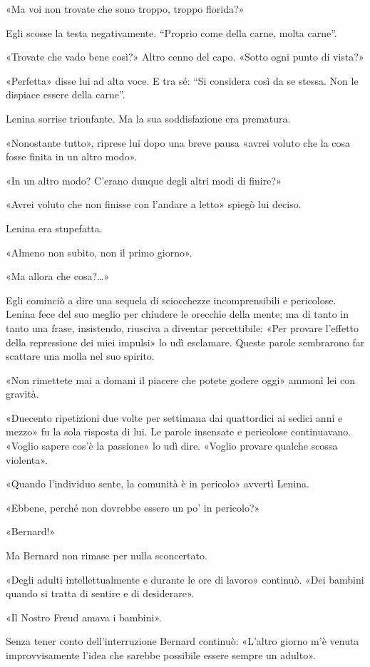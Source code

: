 \documentclass[
a5paper, %
10pt, %
twoside, 
onecolumn, %
openany, %
]{memoir}
\begin{document}
«Ma voi non trovate che sono troppo, troppo florida?»

Egli scosse la testa negativamente. “Proprio come della carne, molta carne”.

«Trovate che vado bene così?» Altro cenno del capo. «Sotto ogni punto di vista?»

«Perfetta» disse lui ad alta voce. E tra sé: “Si considera così da se stessa. Non le dispiace essere della carne”.

Lenina sorrise trionfante. Ma la sua soddisfazione era prematura.

«Nonostante tutto», riprese lui dopo una breve pausa «avrei voluto che la cosa fosse finita in un altro modo».

«In un altro modo? C’erano dunque degli altri modi di finire?»

«Avrei voluto che non finisse con l’andare a letto» spiegò lui deciso.

Lenina era stupefatta.

«Almeno non subito, non il primo giorno».

«Ma allora che cosa?…»

Egli cominciò a dire una sequela di sciocchezze incomprensibili e pericolose. Lenina fece del suo meglio per chiudere le orecchie della mente; ma di tanto in tanto una frase, insistendo, riusciva a diventar percettibile: «Per provare l’effetto della repressione dei miei impulsi» lo udì esclamare. Queste parole sembrarono far scattare una molla nel suo spirito.

«Non rimettete mai a domani il piacere che potete godere oggi» ammonì lei con gravità.

«Duecento ripetizioni due volte per settimana dai quattordici ai sedici anni e mezzo» fu la sola risposta di lui. Le parole insensate e pericolose continuavano. «Voglio sapere cos’è la passione» lo udì dire. «Voglio provare qualche scossa violenta».

«Quando l’individuo sente, la comunità è in pericolo» avvertì Lenina.

«Ebbene, perché non dovrebbe essere un po’ in pericolo?»

«Bernard!»

Ma Bernard non rimase per nulla sconcertato.

«Degli adulti intellettualmente e durante le ore di lavoro» continuò. «Dei bambini quando si tratta di sentire e di desiderare».

«Il Nostro Freud amava i bambini».

Senza tener conto dell’interruzione Bernard continuò: «L’altro giorno m’è venuta improvvisamente l’idea che sarebbe possibile essere sempre un adulto».
\end{document}
